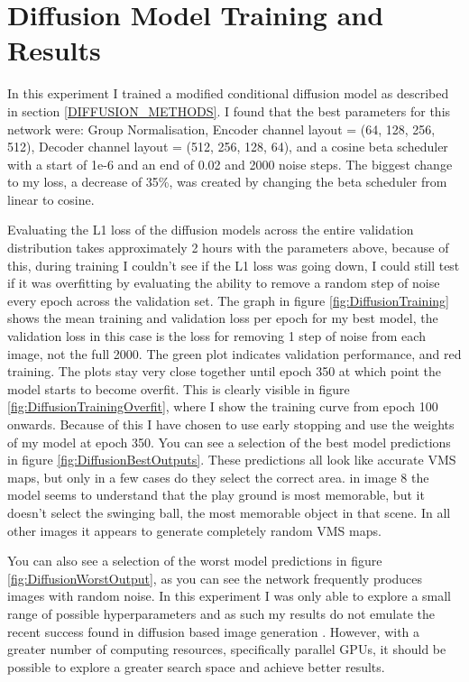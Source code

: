 \documentclass{UoYCSproject}
\begin{document}
\section{Diffusion Model Training and Results}

In this experiment I trained a modified conditional diffusion model as described in section \ref{DIFFUSION_METHODS}.
I found that the best parameters for this network were: Group Normalisation, Encoder channel layout = (64, 128, 256, 512), Decoder channel layout = (512, 256, 128, 64), and a cosine beta scheduler with a start of 1e-6 and an end of 0.02 and 2000 noise steps. The biggest change to my loss, a decrease of 35\%, was created by changing the beta scheduler from linear to cosine.

Evaluating the L1 loss of the diffusion models across the entire validation distribution takes approximately 2 hours with the parameters above, because of this, during training I couldn't see if the L1 loss was going down, I could still test if it was overfitting by evaluating the ability to remove a random step of noise every epoch across the validation set. The graph in figure 
\ref{fig:DiffusionTraining}
shows the mean training and validation loss per epoch for my best model, the validation loss in this case is the loss for removing 1 step of noise from each image, not the full 2000. The green plot indicates validation performance, and red training. The plots stay very close together until epoch 350 at which point the model starts to become overfit. This is clearly visible in figure \ref{fig:DiffusionTrainingOverfit}, where I show the training curve from epoch 100 onwards. Because of this I have chosen to use early stopping and use the weights of my model at epoch 350.
You can see a selection of the best model predictions in figure \ref{fig:DiffusionBestOutputs}.
These predictions all look like accurate VMS maps, but only in a few cases do they select the correct area. in image 8 the model seems to understand that the play ground is most memorable, but it doesn't select the swinging ball, the most memorable object in that scene. In all other images it appears to generate completely random VMS maps. 

You can also see a selection of the worst model predictions in figure \ref{fig:DiffusionWorstOutput}, as you can see the network frequently produces images with random noise. In this experiment I was only able to explore a small range of possible hyperparameters and as such my results do not emulate the recent success found in diffusion based image generation \cite{ramesh2022hierarchical, saharia2022photorealistic}. However, with a greater number of computing resources, specifically parallel GPUs, it should be possible to explore a greater search space and achieve better results.
\end{document}
